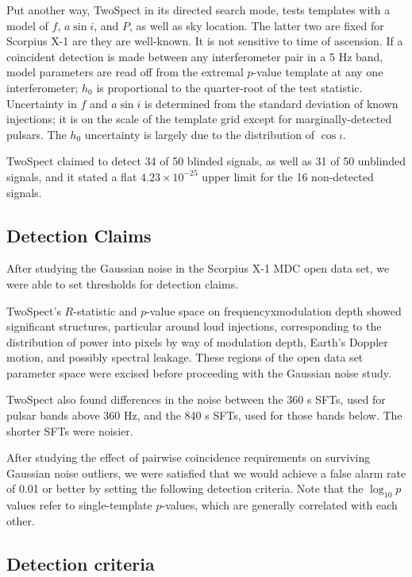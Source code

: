 Put another way, TwoSpect
in its directed search mode, tests templates with a model of
$f$, $a \sin i$, and $P$, as well as sky location. The latter two are
fixed for Scorpius X-1 are they are well-known. 
It is not sensitive to time of ascension.
If a coincident detection is made between any interferometer pair in a 5 Hz band,
model parameters are read off from the extremal $p$-value template at
any one interferometer; $h_0$ is proportional to the quarter-root of
the test statistic. Uncertainty in $f$ and $a \sin i$ is determined
from the standard deviation of known injections; it is on the scale
of the template grid except for marginally-detected pulsars. The $h_0$ 
uncertainty is largely due to the distribution of $\cos \iota$. 

TwoSpect claimed to detect 34 of 50 blinded signals, as well as 31 of 50 unblinded signals, and it stated a flat
$4.23 \times 10^{-25}$ upper limit for the 16 non-detected signals. 

\subsection{Detection Claims}

After studying the Gaussian noise in the Scorpius X-1 MDC open data set, we were able to set thresholds for detection claims.

TwoSpect's $R$-statistic and $p$-value space on {frequency}x{modulation depth} showed significant structures, particular around loud injections, corresponding to the distribution of power into pixels by way of modulation depth, Earth's Doppler motion, and possibly spectral leakage. These regions of the open data set parameter space were excised before proceeding with the Gaussian noise study.

TwoSpect also found differences in the noise between the 360 s SFTs, used for pulsar bands above 360 Hz, and the 840 s SFTs, used for those bands below. The shorter SFTs were noisier.

After studying the effect of pairwise coincidence requirements on surviving Gaussian noise outliers, we were satisfied that we would achieve a false alarm rate of 0.01 or better by setting the following detection criteria. Note that the $\log_{10} p$ values refer to single-template $p$-values, which are generally correlated with each other.

\subsection{Detection criteria}

